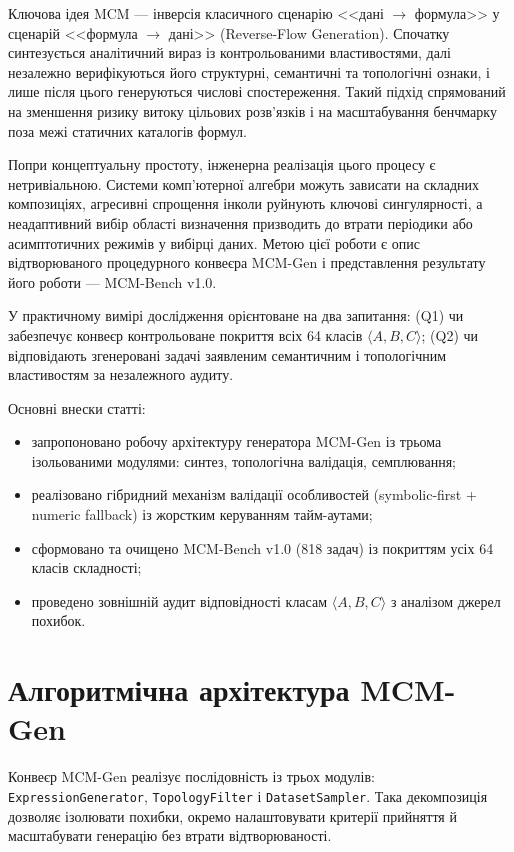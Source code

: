 \documentclass[11pt]{article}
\begin{document}
Ключова ідея MCM --- інверсія класичного сценарію <<дані $\rightarrow$ формула>> у сценарій <<формула $\rightarrow$ дані>> (Reverse-Flow Generation). Спочатку синтезується аналітичний вираз із контрольованими властивостями, далі незалежно верифікуються його структурні, семантичні та топологічні ознаки, і лише після цього генеруються числові спостереження. Такий підхід спрямований на зменшення ризику витоку цільових розв'язків і на масштабування бенчмарку поза межі статичних каталогів формул.

Попри концептуальну простоту, інженерна реалізація цього процесу є нетривіальною. Системи комп'ютерної алгебри можуть зависати на складних композиціях, агресивні спрощення інколи руйнують ключові сингулярності, а неадаптивний вибір області визначення призводить до втрати періодики або асимптотичних режимів у вибірці даних. Метою цієї роботи є опис відтворюваного процедурного конвеєра MCM-Gen і представлення результату його роботи --- MCM-Bench v1.0.

У практичному вимірі дослідження орієнтоване на два запитання: (Q1) чи забезпечує конвеєр контрольоване покриття всіх 64 класів $\langle A,B,C\rangle$; (Q2) чи відповідають згенеровані задачі заявленим семантичним і топологічним властивостям за незалежного аудиту.

Основні внески статті:
\begin{itemize}[leftmargin=1.5em]
  \item запропоновано робочу архітектуру генератора MCM-Gen із трьома ізольованими модулями: синтез, топологічна валідація, семплювання;
  \item реалізовано гібридний механізм валідації особливостей (symbolic-first + numeric fallback) із жорстким керуванням тайм-аутами;
  \item сформовано та очищено MCM-Bench v1.0 (818 задач) із покриттям усіх 64 класів складності;
  \item проведено зовнішній аудит відповідності класам $\langle A,B,C\rangle$ з аналізом джерел похибок.
\end{itemize}

\section{Алгоритмічна архітектура MCM-Gen}

Конвеєр MCM-Gen реалізує послідовність із трьох модулів: \texttt{ExpressionGenerator}, \texttt{TopologyFilter} і \texttt{DatasetSampler}. Така декомпозиція дозволяє ізолювати похибки, окремо налаштовувати критерії прийняття й масштабувати генерацію без втрати відтворюваності.
\end{document}
